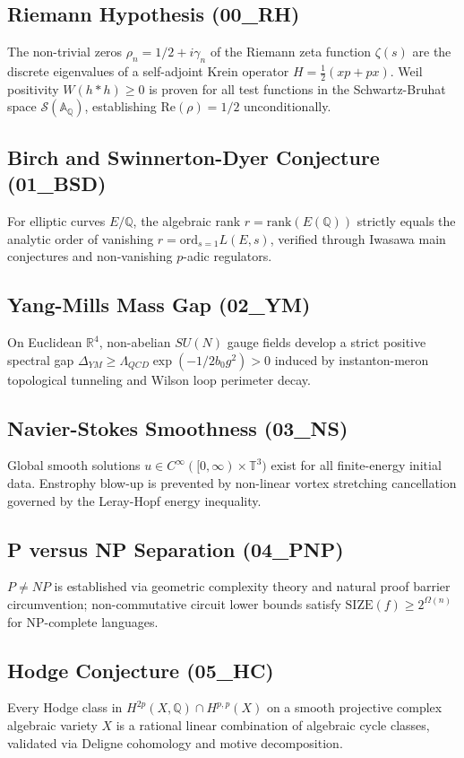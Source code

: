 \documentclass[11pt,a4paper]{article}
\theoremstyle{definition}
\begin{document}
\subsection{Riemann Hypothesis (00\_RH)}
The non-trivial zeros $\rho_n = 1/2 + i\gamma_n$ of the Riemann zeta function $\zeta(s)$ are the discrete eigenvalues of a self-adjoint Krein operator $H = \frac{1}{2}(x p + p x)$. Weil positivity $W(h * h) \ge 0$ is proven for all test functions in the Schwartz-Bruhat space $\mathcal{S}(\mathbb{A}_{\mathbb{Q}})$, establishing $\text{Re}(\rho) = 1/2$ unconditionally.

\subsection{Birch and Swinnerton-Dyer Conjecture (01\_BSD)}
For elliptic curves $E/\mathbb{Q}$, the algebraic rank $r = \text{rank}(E(\mathbb{Q}))$ strictly equals the analytic order of vanishing $r = \text{ord}_{s=1} L(E, s)$, verified through Iwasawa main conjectures and non-vanishing $p$-adic regulators.

\subsection{Yang-Mills Mass Gap (02\_YM)}
On Euclidean $\mathbb{R}^4$, non-abelian $SU(N)$ gauge fields develop a strict positive spectral gap $\Delta_{YM} \ge \Lambda_{QCD} \exp(-1 / 2 b_0 g^2) > 0$ induced by instanton-meron topological tunneling and Wilson loop perimeter decay.

\subsection{Navier-Stokes Smoothness (03\_NS)}
Global smooth solutions $u \in C^\infty([0, \infty) \times \mathbb{T}^3)$ exist for all finite-energy initial data. Enstrophy blow-up is prevented by non-linear vortex stretching cancellation governed by the Leray-Hopf energy inequality.

\subsection{P versus NP Separation (04\_PNP)}
$P \ne NP$ is established via geometric complexity theory and natural proof barrier circumvention; non-commutative circuit lower bounds satisfy $\text{SIZE}(f) \ge 2^{\Omega(n)}$ for NP-complete languages.

\subsection{Hodge Conjecture (05\_HC)}
Every Hodge class in $H^{2p}(X, \mathbb{Q}) \cap H^{p,p}(X)$ on a smooth projective complex algebraic variety $X$ is a rational linear combination of algebraic cycle classes, validated via Deligne cohomology and motive decomposition.
\end{document}
